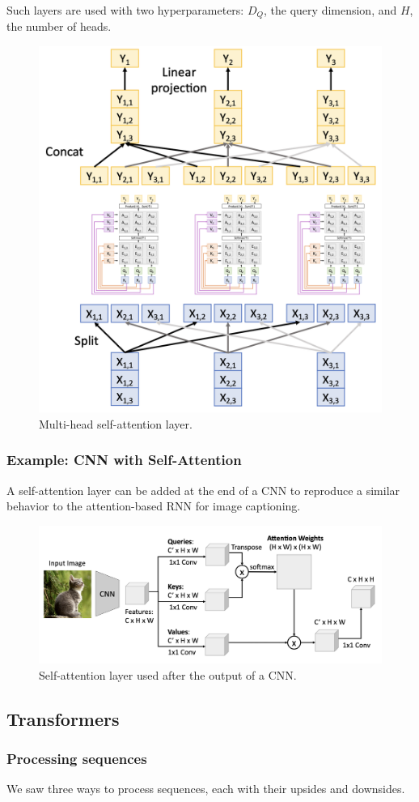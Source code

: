 Such layers are used with two hyperparameters: $D_Q$, the query dimension, and $H$, the number of heads.
\begin{figure}[H]
    \centering
    \includegraphics[width=.45\textwidth]{images/multi-head-attention.png}
    \caption{Multi-head self-attention layer.}
\end{figure}

\subsubsection{Example: CNN with Self-Attention}
A self-attention layer can be added at the end of a CNN to reproduce a similar behavior to the attention-based RNN for image captioning.
\begin{figure}[H]
    \centering
    \includegraphics[width=.85\textwidth]{images/self-attention-cnn.png}
    \caption{Self-attention layer used after the output of a CNN.}
\end{figure}

\subsection{Transformers}
\subsubsection{Processing sequences}
We saw three ways to process sequences, each with their upsides and downsides.

